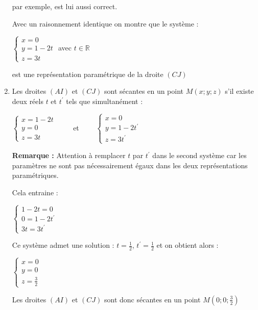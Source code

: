 \begin{corrige}
\begin{enumerate}
                    par exemple, est lui aussi correct.
                    \par
                    Avec un raisonnement identique on montre que le système :
                    \begin{center}$\left\{ \begin{matrix} x=0 \\ y=1-2t \\ z=3t \end{matrix}\right.      $  avec $t \in  \mathbb{R}$\end{center}
                         est une représentation paramétrique de la droite $\left(CJ\right)$
                         \item
                         Les droites $\left(AI\right)$ et $\left(CJ\right)$ sont sécantes en un point $M\left(x ; y ; z\right)$ s'il existe deux réels $t$ et $t^{\prime}$ tels que simultanément :
                         \begin{center}$\left\{ \begin{matrix} x=1-2t \\ y=0 \\ z=3t \end{matrix}\right.  \qquad    $ et $    \qquad      \left\{ \begin{matrix} x=0 \\ y=1-2t^{\prime} \\ z=3t^{\prime} \end{matrix}\right.      $  \end{center}
                                   \textbf{Remarque :} Attention à remplacer $t$ par $t^{\prime}$ dans le second système car les paramètres ne sont pas nécessairement égaux dans les deux représentations paramétriques.
                                   \par
                                   Cela entraine :
                                   \par
                                   $\left\{ \begin{matrix} 1-2t=0 \\ 0=1-2t^{\prime} \\ 3t=3t^{\prime} \end{matrix}\right.$
                                        \par
                                        Ce système admet une solution : $t=\frac{1}{2}$, $t^{\prime}=\frac{1}{2}$ et on obtient alors :
                                        \par
                                        $\left\{ \begin{matrix} x=0 \\ y=0 \\ z=\frac{3}{2} \end{matrix}\right.$
                                             \par
                                             Les droites $\left(AI\right)$ et $\left(CJ\right)$ sont donc sécantes en un point $M\left(0 ; 0 ; \frac{3}{2}\right)$
                                        \end{enumerate}
                                   \end{corrige}
